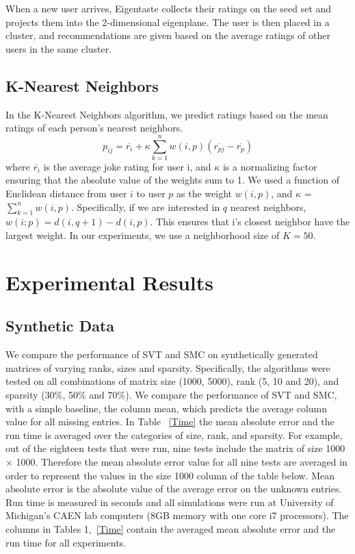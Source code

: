 \documentclass{article} %
\begin{document}
When a new user arrives, Eigentaste collects their ratings on the seed
set and projects them into the 2-dimensional eigenplane. The user is
then placed in a cluster, and recommendations are given based on the
average ratings of other users in the same cluster.

\subsection{K-Nearest Neighbors}
In the K-Nearest Neighbors algorithm, we predict ratings based on the
mean ratings of each person's nearest neighbors.
\begin{equation*}
  p_{ij}=\overline{r_{i}}+\kappa\sum_{k=1}^n w(i,p)(\overline{r_{pj}}-\overline{r_{p}})
\end{equation*}
where $\overline{r_{i}}$ is the average joke rating for user i, and
$\kappa$ is a normalizing factor ensuring that the absolute value of
the weights sum to 1. We used a function of Euclidean distance from
user $i$ to user $p$ as the weight $w(i, p)$, and $\kappa$ =
$\sum_{k=1}^n w(i,p)$. Specifically, if we are interested in $q$
nearest neighbors, $w(i; p) = d(i, q +1)- d(i, p)$. This ensures that
i’s closest neighbor have the largest weight. In our experiments, we
use a neighborhood size of $K=50$.

\section{Experimental Results}

\subsection{Synthetic Data}

We compare the performance of SVT and SMC on synthetically generated
matrices of varying ranks, sizes and sparsity. Specifically, the
algorithms were tested on all combinations of matrix size (1000,
5000), rank (5, 10 and 20), and sparsity (30\%, 50\% and 70\%). We
compare the performance of SVT and SMC, with a simple baseline, the
column mean, which predicts the average column value for all missing
entries. In Table ~\ref{Time} the mean absolute error and the run time
is averaged over the categories of size, rank, and sparsity. For
example, out of the eighteen tests that were run, nine tests include
the matrix of size 1000 $\times$ 1000. Therefore the mean absolute
error value for all nine tests are averaged in order to represent the
values in the size 1000 column of the table below. Mean absolute error
is the absolute value of the average error on the unknown entries. Run
time is measured in seconds and all simulations were run at University
of Michigan's CAEN lab computers (8GB memory with one core i7
processors). The columns in Tables 1,~\ref{Time} contain the averaged
mean absolute error and the run time for all experiments.
\end{document}
